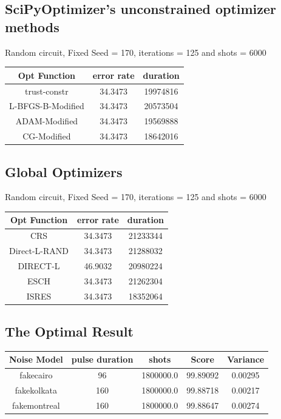 \documentclass{article}
\begin{document}
\subsection{SciPyOptimizer's unconstrained optimizer methods}  
Random circuit, Fixed Seed = 170, iterations = 125 and shots = 6000
\begin{center}
\scriptsize
\begin{tabular}{||c c c||} 
 \hline
 Opt Function & error rate & duration \\ [0.5ex] 
 \hline\hline
trust-constr & 34.3473 & 19974816 \\
L-BFGS-B-Modified & 34.3473 & 20573504 \\
ADAM-Modified & 34.3473 & 19569888 \\
CG-Modified & 34.3473 & 18642016 \\ [1ex] 
 \hline

\end{tabular}
\end{center}

\subsection{Global Optimizers}
Random circuit, Fixed Seed = 170, iterations = 125 and shots = 6000
\begin{center}
\scriptsize
\begin{tabular}{||c c c||} 
 \hline
 Opt Function & error rate & duration\\ [0.5ex] 
 \hline\hline
CRS & 34.3473 & 21233344 \\
Direct-L-RAND & 34.3473 & 21288032 \\
DIRECT-L & 46.9032 & 20980224 \\
ESCH & 34.3473 & 21262304 \\
ISRES & 34.3473 & 18352064 \\[1ex] 
 \hline

\end{tabular}
\end{center}

\subsection{The Optimal Result}

\begin{center}
\scriptsize
\begin{tabular}{||c c c c c||} 
 \hline
 Noise Model & pulse duration & shots & Score & Variance  \\ [0.5ex] 
 \hline\hline
fakecairo & 96 & 1800000.0 & 99.89092 & 0.00295 \\
fakekolkata & 160 & 1800000.0 & 99.88718 & 0.00217 \\
fakemontreal & 160 & 1800000.0 & 99.88647 & 0.00274 \\[1ex] 
 \hline
\end{tabular}
\end{center}
\end{document}
